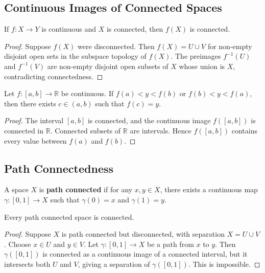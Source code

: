 \subsection{Continuous Images of Connected Spaces}

\begin{theorem}
If $f:X\to Y$ is continuous and $X$ is connected, then $f(X)$ is connected.
\end{theorem}

\begin{proof}
Suppose $f(X)$ were disconnected. Then $f(X)=U\cup V$ for non-empty disjoint open sets in the subspace topology of $f(X)$. The preimages $f^{-1}(U)$ and $f^{-1}(V)$ are non-empty disjoint open subsets of $X$ whose union is $X$, contradicting connectedness.
\end{proof}

\begin{theorem}
Let $f:[a,b]\to\mathbb{R}$ be continuous. If $f(a)<y<f(b)$ or $f(b)<y<f(a)$, then there exists $c\in(a,b)$ such that $f(c)=y$.
\end{theorem}

\begin{proof}
The interval $[a,b]$ is connected, and the continuous image $f([a,b])$ is connected in $\mathbb{R}$. Connected subsets of $\mathbb{R}$ are intervals. Hence $f([a,b])$ contains every value between $f(a)$ and $f(b)$.
\end{proof}

\subsection{Path Connectedness}

\begin{definition}
A space $X$ is \textbf{path connected} if for any $x,y\in X$, there exists a continuous map $\gamma:[0,1]\to X$ such that $\gamma(0)=x$ and $\gamma(1)=y$.
\end{definition}

\begin{proposition}
Every path connected space is connected.
\end{proposition}

\begin{proof}
Suppose $X$ is path connected but disconnected, with separation $X=U\cup V$. Choose $x\in U$ and $y\in V$. Let $\gamma:[0,1]\to X$ be a path from $x$ to $y$. Then $\gamma([0,1])$ is connected as a continuous image of a connected interval, but it intersects both $U$ and $V$, giving a separation of $\gamma([0,1])$. This is impossible.
\end{proof}

